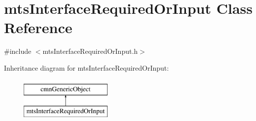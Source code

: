 \hypertarget{classmts_interface_required_or_input}{}\section{mts\+Interface\+Required\+Or\+Input Class Reference}
\label{classmts_interface_required_or_input}


{\ttfamily \#include $<$mts\+Interface\+Required\+Or\+Input.\+h$>$}

Inheritance diagram for mts\+Interface\+Required\+Or\+Input\+:\begin{figure}[H]
\begin{center}
\leavevmode
\includegraphics[height=2.000000cm]{de/dcd/classmts_interface_required_or_input}
\end{center}
\end{figure}
